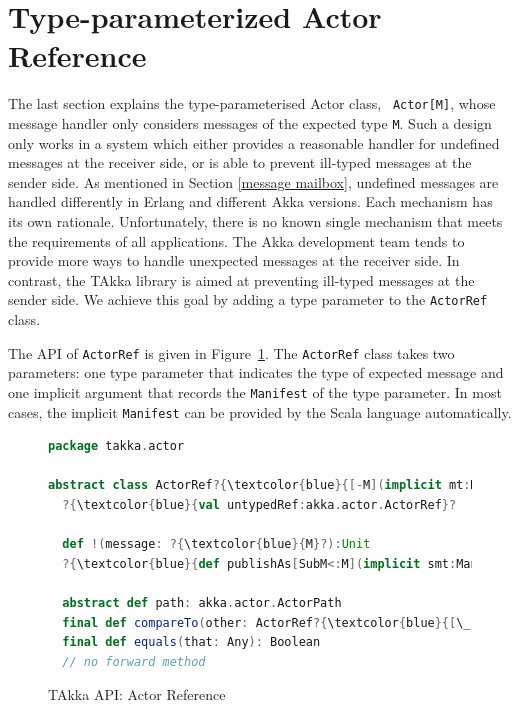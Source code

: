 \section{Type-parameterized Actor Reference}
\label{takka_actor_ref}

The last section explains the type-parameterised Actor class, {\tt  
Actor[M]}, whose message handler only considers messages of the expected 
type {\tt M}.  Such a design only works in a system which either provides a 
reasonable handler for undefined messages at the receiver side,  or is able to 
prevent ill-typed messages at the sender side.  As mentioned in Section 
\ref{message mailbox}, undefined messages are handled differently in Erlang and 
different Akka versions.  Each mechanism has its own rationale.  
Unfortunately, there is no known single mechanism that meets the requirements of 
all applications.  The Akka development team tends to provide more ways to 
handle unexpected messages at the receiver side.  In contrast,  the TAkka 
library is aimed at preventing ill-typed messages at the sender side.  
We achieve this goal by adding a type parameter to the {\tt ActorRef} class.

The API of {\tt ActorRef} is given in Figure~\ref{takka_actor_reference_api}.  
The {\tt ActorRef} class takes two parameters: one type 
parameter that indicates the type of expected message and one implicit 
argument that records the {\tt Manifest} of the type parameter.  In most 
cases, the implicit {\tt Manifest} can be provided by the Scala language 
automatically.


\begin{figure}[h]
\begin{lstlisting}[language=scala,  escapechar=?]
package takka.actor 

abstract class ActorRef?{\textcolor{blue}{[-M](implicit mt:Manifest[M])}?
  ?{\textcolor{blue}{val untypedRef:akka.actor.ActorRef}? 

  def !(message: ?{\textcolor{blue}{M}?):Unit
  ?{\textcolor{blue}{def publishAs[SubM<:M](implicit smt:Manifest[SubM]):ActorRef[SubM]}?

  abstract def path: akka.actor.ActorPath
  final def compareTo(other: ActorRef?{\textcolor{blue}{[\_]}?): Int
  final def equals(that: Any): Boolean
  // no forward method

\end{lstlisting}
\caption{TAkka API: Actor Reference}
\label{takka_actor_reference_api}
\end{figure}


